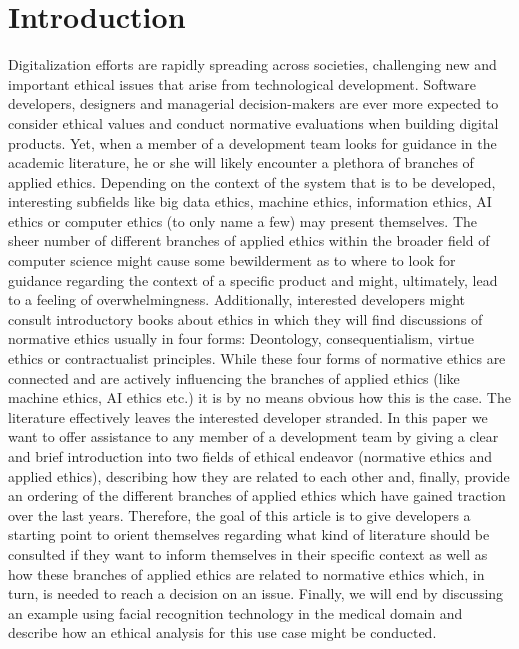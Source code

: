 \documentclass[manuscript,screen]{acmart}
\begin{document}
\maketitle

\section{Introduction}
Digitalization efforts are rapidly spreading across societies, challenging new and important ethical issues that arise from technological development. Software developers, designers and managerial decision-makers are ever more expected to consider ethical values and conduct normative evaluations when building digital products. Yet, when a member of a development team looks for guidance in the academic literature, he or she will likely encounter a plethora of branches of applied ethics. Depending on the context of the system that is to be developed, interesting subfields like big data ethics, machine ethics, information ethics, AI ethics or computer ethics (to only name a few) may present themselves. The sheer number of different branches of applied ethics within the broader field of computer science might cause some bewilderment as to where to look for guidance regarding the context of a specific product and might, ultimately, lead to a feeling of overwhelmingness. Additionally, interested developers might consult introductory books about ethics in which they will find discussions of normative ethics usually in four forms: Deontology, consequentialism, virtue ethics  or contractualist principles. While these four forms of normative ethics are connected and are actively influencing the branches of applied ethics (like machine ethics, AI ethics etc.) it is by no means obvious how this is the case. The literature effectively leaves the interested developer stranded. In this paper we want to offer assistance to any member of a development team by giving a clear and brief introduction into two fields of ethical endeavor (normative ethics and applied ethics), describing how they are related to each other and, finally, provide an ordering of the different branches of applied ethics which have gained traction over the last years. Therefore, the goal of this article is to give developers a starting point to orient themselves regarding what kind of literature should be consulted if they want to inform themselves in their specific context as well as how these branches of applied ethics are related to normative ethics which, in turn, is needed to reach a decision on an issue. Finally, we will end by discussing an example using facial recognition technology in the medical domain and describe how an ethical analysis for this use case might be conducted.
\end{document}
